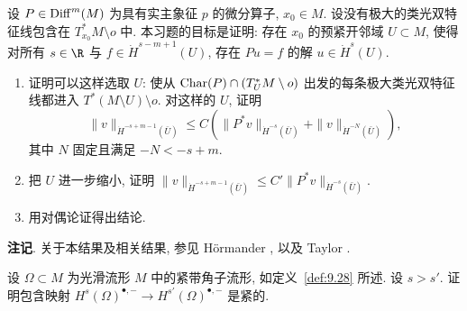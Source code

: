 \begin{exer}\label{ex:9.8}
设 $P \in \operatorname{Diff}^m(M)$ 为具有实主象征 $p$ 的微分算子, $x_0 \in M$. 设没有极大的类光双特征线包含在 $T_{x_0}^* M \setminus o$ 中. 本习题的目标是证明: 存在 $x_0$ 的预紧开邻域 $U \subset M$, 使得对所有 $s \in \R$ 与 $f \in \dot{H}^{s-m+1}(U)$, 存在 $P u = f$ 的解 $u \in \dot{H}^s(U)$.
\begin{enumerate}[label=(\arabic*)]
    \item 证明可以这样选取 $U$: 使从 $\operatorname{Char}(P) \cap (T_U^* M \setminus o)$ 出发的每条极大类光双特征线都进入 $T^*(M \setminus U) \setminus o$. 对这样的 $U$, 证明
    \begin{equation}\label{eq:9.161}
        \|v\|_{\dot{H}^{-s+m-1}(\bar U)} \le C \left( \|P^* v\|_{\dot{H}^{-s}(\bar U)} + \|v\|_{\dot{H}^{-N}(\bar U)} \right),
    \end{equation}
    其中 $N$ 固定且满足 $-N < -s + m$.
    \item 把 $U$ 进一步缩小, 证明 $\|v\|_{\dot{H}^{-s+m-1}(\bar U)} \le C' \|P^* v\|_{\dot{H}^{-s}(\bar U)}$.
    \item 用对偶论证得出结论.
\end{enumerate}
\textbf{注记}. 关于本结果及相关结果, 参见 Hörmander \cite[第 III, XIII 章]{Hor63}, \cite[\S 3.2]{Hor71b} 以及 Taylor \cite[第 VI 章, \S 3]{Tay81}.
\end{exer}

\begin{exer}[Rellich 紧性]\label{ex:9.9}
设 $\Omega \subset M$ 为光滑流形 $M$ 中的紧带角子流形, 如定义~\ref{def:9.28} 所述. 设 $s > s'$. 证明包含映射 $H^s(\Omega)^{\bullet,-} \to H^{s'}(\Omega)^{\bullet,-}$ 是紧的.
\end{exer}

